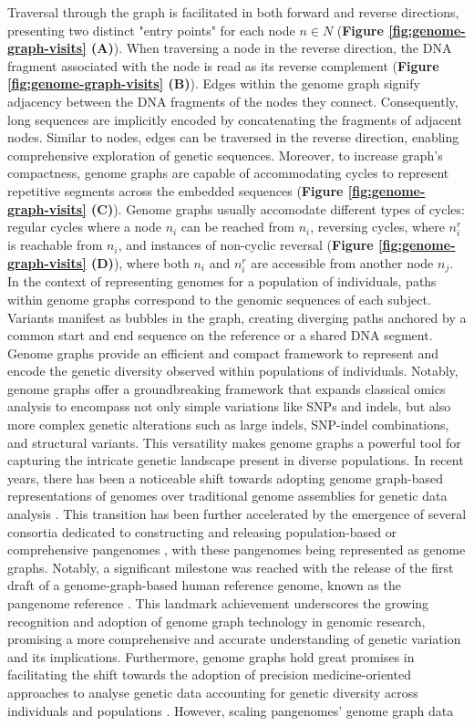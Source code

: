 \documentclass[a4paper, titlepage, openright]{book}
\begin{document}
Traversal through the graph is facilitated in both forward and reverse directions, presenting two distinct "entry points" for each node $n \in N$ (\textbf{Figure \ref{fig:genome-graph-visits} (A)}). When traversing a node in the reverse direction, the DNA fragment associated with the node is read as its reverse complement (\textbf{Figure \ref{fig:genome-graph-visits} (B)}). Edges within the genome graph signify adjacency between the DNA fragments of the nodes they connect. Consequently, long sequences are implicitly encoded by concatenating the fragments of adjacent nodes. Similar to nodes, edges can be traversed in the reverse direction, enabling comprehensive exploration of genetic sequences. Moreover, to increase graph's compactness, genome graphs are capable of accommodating cycles to represent repetitive segments across the embedded sequences (\textbf{Figure \ref{fig:genome-graph-visits} (C)}). Genome graphs usually accomodate different types of cycles: regular cycles where a node $n_{i}$ can be reached from $n_{i}$, reversing cycles, where $n^{r}_{i}$ is reachable from $n_{i}$, and instances of non-cyclic reversal (\textbf{Figure \ref{fig:genome-graph-visits} (D)}), where both $n_{i}$ and $n^{r}_{i}$ are accessible from another node $n_{j}$. In the context of representing genomes for a population of individuals, paths within genome graphs correspond to the genomic sequences of each subject. Variants manifest as bubbles in the graph, creating diverging paths anchored by a common start and end sequence on the reference \citep{paten2018superbubbles} or a shared DNA segment. Genome graphs provide an efficient and compact framework to represent and encode the genetic diversity observed within populations of individuals. Notably, genome graphs offer a groundbreaking framework that expands classical omics analysis to encompass not only simple variations like SNPs and indels, but also more complex genetic alterations such as large indels, SNP-indel combinations, and structural variants. This versatility makes genome graphs a powerful tool for capturing the intricate genetic landscape present in diverse populations. In recent years, there has been a noticeable shift towards adopting genome graph-based representations of genomes over traditional genome assemblies for genetic data analysis \citep{hurgobin2017snp}. This transition has been further accelerated by the emergence of several consortia dedicated to constructing and releasing population-based \citep{gao2023pangenome} or comprehensive pangenomes \citep{wang2022human}, with these pangenomes being represented as genome graphs. Notably, a significant milestone was reached with the release of the first draft of a genome-graph-based human reference genome, known as the pangenome reference \citep{liao2023draft}. This landmark achievement underscores the growing recognition and adoption of genome graph technology in genomic research, promising a more comprehensive and accurate understanding of genetic variation and its implications. Furthermore, genome graphs  hold great promises in facilitating the shift towards the adoption of precision medicine-oriented approaches to analyse genetic data accounting for genetic diversity across individuals and populations \citep{yu2023human}. However, scaling pangenomes' genome graph data 
\end{document}
